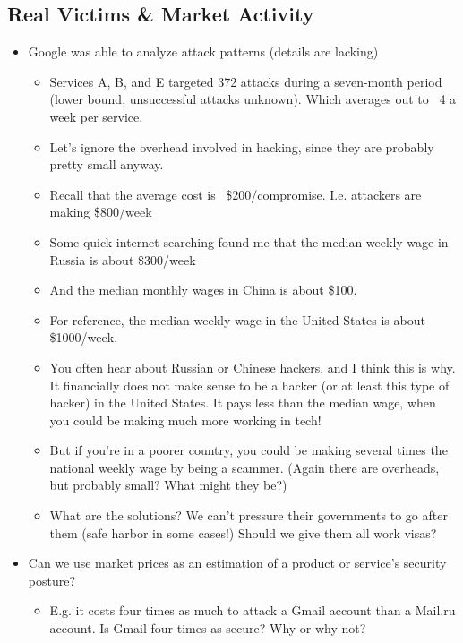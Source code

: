 \documentclass[11pt]{article}
\begin{document}
\subsection{Real Victims \& Market Activity}

    \begin{itemize}
        \item Google was able to analyze attack patterns (details are lacking)
        \begin{itemize}
            \item Services A, B, and E targeted 372 attacks during a seven-month period (lower bound, unsuccessful attacks unknown). Which averages out to ~4 a week per service. 
            \item Let's ignore the overhead involved in hacking, since they are probably pretty small anyway.
            \item Recall that the average cost is ~\$200/compromise. I.e. attackers are making \$800/week
            \item Some quick internet searching found me that the median weekly wage in Russia is about \$300/week
            \item And the median monthly wages in China is about \$100.
            \item For reference, the median weekly wage in the United States is about \$1000/week. 
            \item You often hear about Russian or Chinese hackers, and I think this is why. It financially does not make sense to be a hacker (or at least this type of hacker) in the United States. It pays less than the median wage, when you could be making much more working in tech! 
            \item But if you're in a poorer country, you could be making several times the national weekly wage by being a scammer. (Again there are overheads, but probably small? What might they be?)
            \item What are the solutions? We can't pressure their governments to go after them (safe harbor in some cases!) Should we give them all work visas?
        \end{itemize}
        \item Can we use market prices as an estimation of a product or service's security posture?
        \begin{itemize}
            \item E.g. it costs four times as much to attack a Gmail account than a Mail.ru account. Is Gmail four times as secure? Why or why not?

\end{itemize}
\end{itemize}
\end{document}
